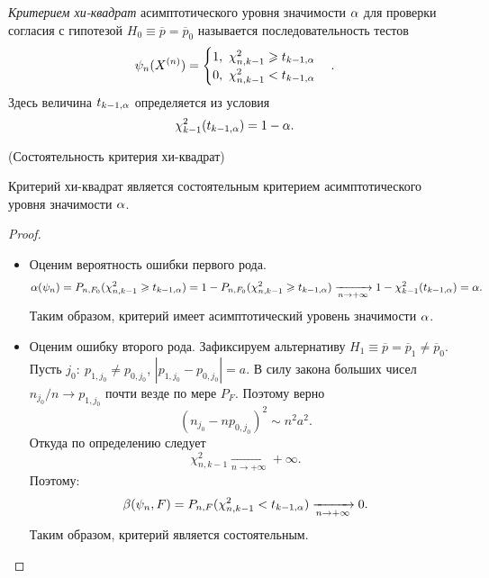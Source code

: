 \begin{definition}
    \textit{Критерием хи-квадрат} асимптотического уровня значимости $\alpha$
    для проверки согласия с гипотезой $H_0 \equiv \overline{p} = \overline{p}_0$
    называется последовательность тестов
    \[
        \psi_n(X^{(n)}) = \begin{cases}
            1,~ \chi^2_{n, k - 1} \geqslant t_{k - 1, \alpha} \\
            0,~ \chi^2_{n, k - 1} < t_{k - 1, \alpha}
        \end{cases}
    .\]
    Здесь величина $t_{k - 1, \alpha}$ определяется из условия
    \[
        \chi^2_{k - 1}(t_{k - 1, \alpha}) = 1 - \alpha
    .\]
\end{definition}

\begin{theorem}(Состоятельность критерия хи-квадрат)

    Критерий хи-квадрат является состоятельным критерием асимптотического
    уровня значимости $\alpha$.
\end{theorem}
\begin{proof}
    \enewline
    \begin{itemize}
        \item Оценим вероятность ошибки первого рода.
            \[
                \alpha(\psi_n) = P_{n, F_0}(\chi^2_{n, k - 1} \geqslant
                t_{k - 1, \alpha}) = 1 - P_{n, F_0}(\chi^2_{n, k - 1} \geqslant
                t_{k - 1, \alpha}) \xrightarrow[n \to +\infty]{} 1 -
                \chi^2_{k - 1}(t_{k - 1, \alpha}) = \alpha
            .\]
            Таким образом, критерий имеет асимптотический уровень значимости
            $\alpha$.
        \item Оценим ошибку второго рода. Зафиксируем альтернативу
            $H_1 \equiv \overline{p} = \overline{p}_1 \neq \overline{p}_0$.
            Пусть $j_0\colon~ p_{1, j_0} \neq p_{0, j_0}$, $|p_{1, j_0}
            - p_{0, j_0}| = a$. В силу закона больших чисел $n_{j_0} / n
            \to p_{1, j_0}$ почти везде по мере $P_F$. Поэтому верно
            \[
                (n_{j_0} - np_{0, j_0})^2 \sim n^2a^2
            .\]
            Откуда по определению следует
            \[
                \chi^2_{n, k - 1} \xrightarrow[n \to +\infty]{} +\infty
            .\]
            Поэтому:
            \[
                \beta(\psi_n, F) = P_{n, F}(\chi^2_{n, k - 1} < t_{k - 1, \alpha})
                \xrightarrow[n \to +\infty]{} 0
            .\]
            Таким образом, критерий является состоятельным.
    \end{itemize}
\end{proof}

